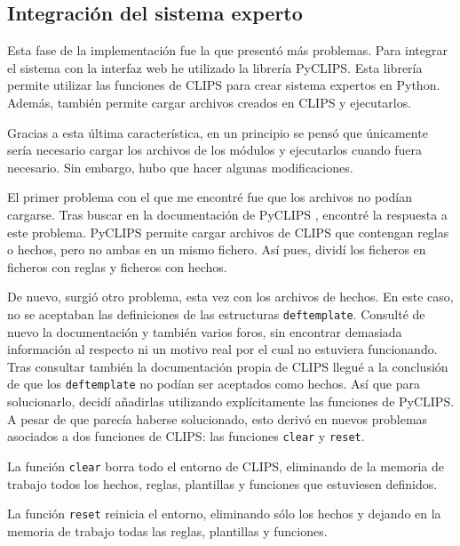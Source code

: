 \subsection{Integración del sistema experto}

Esta fase de la implementación fue la que presentó más problemas. Para integrar el sistema con la interfaz web he utilizado la librería PyCLIPS. Esta librería permite utilizar las funciones de CLIPS para crear sistema expertos en Python. Además, también permite cargar archivos creados en CLIPS y ejecutarlos.

Gracias a esta última característica, en un principio se pensó que únicamente sería necesario cargar los archivos de los módulos y  ejecutarlos cuando fuera necesario. Sin embargo, hubo que hacer algunas modificaciones.

El primer problema con el que me encontré fue que los archivos no podían cargarse. Tras buscar en la documentación de PyCLIPS \cite{PYCLIPS}, encontré la respuesta a este problema. PyCLIPS permite cargar archivos de CLIPS que contengan reglas o hechos, pero no ambas en un mismo fichero. Así pues, dividí los ficheros en ficheros con reglas y ficheros con hechos. 

De nuevo, surgió otro problema, esta vez con los archivos de hechos. En este caso, no se aceptaban las definiciones de las estructuras \texttt{deftemplate}. Consulté de nuevo la documentación y también varios foros, sin encontrar demasiada información al respecto ni un motivo real por el cual no estuviera funcionando. Tras consultar también la documentación propia de CLIPS \cite{CLIPSI, CLIPSII} llegué a la conclusión de que los \texttt{deftemplate} no podían ser aceptados como hechos. Así que para solucionarlo, decidí añadirlas utilizando explícitamente las funciones de PyCLIPS. A pesar de que parecía haberse solucionado, esto derivó en nuevos problemas asociados a dos funciones de CLIPS: las funciones \texttt{clear} y \texttt{reset}.

\bigskip

La función \texttt{clear} borra todo el entorno de CLIPS, eliminando de la memoria de trabajo todos los hechos, reglas, plantillas y funciones que estuviesen definidos.

\bigskip

La función \texttt{reset} reinicia el entorno, eliminando sólo los hechos y dejando en la memoria de trabajo todas las reglas, plantillas y funciones.

\bigskip

